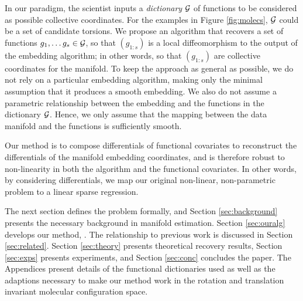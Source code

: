 In our paradigm, the scientist inputs a {\em dictionary} ${\cal G}$
of functions to be considered as possible collective coordinates. For the examples
in Figure \ref{fig:molecs}, ${\cal G}$ could be a set of candidate
torsions. We propose an algorithm that recovers a set of functions
$g_1,\ldots g_s\in{\cal G}$, so that $(g_{1:s})$ is a local diffeomorphism
to the output of the embedding algorithm; in other words, so that
$(g_{1:s})$ are collective coordinates for the manifold. To keep the approach as
general as possible, we do not rely on a particular embedding
algorithm, making only the minimal assumption that it produces a
smooth embedding. We also do not assume a parametric relationship
between the embedding and the functions in the dictionary ${\cal G}$. Hence,
we only assume that the mapping between the data manifold and the
functions is sufficiently smooth. 

Our method is to compose differentials of functional covariates to
reconstruct the differentials of the manifold embedding coordinates, and is
therefore robust to non-linearity in both the algorithm and the
functional covariates. In other words, by considering differentials,
we map our original non-linear, non-parametric problem to a 
linear sparse regression.

The next section defines the problem formally,
and Section \ref{sec:background} presents the necessary background in manifold
estimation. Section \ref{sec:ouralg} develops our method, \ouralg.  
The relationship to previous work is discussed in
Section \ref{sec:related}. Section \ref{sec:theory} presents theoretical recovery results,  Section \ref{sec:exps} presents experiments, and Section \ref{sec:conc} concludes the paper. The Appendices present details of the functional dictionaries used as well as the adaptions necessary to make our method work in the rotation and translation invariant molecular configuration space.

